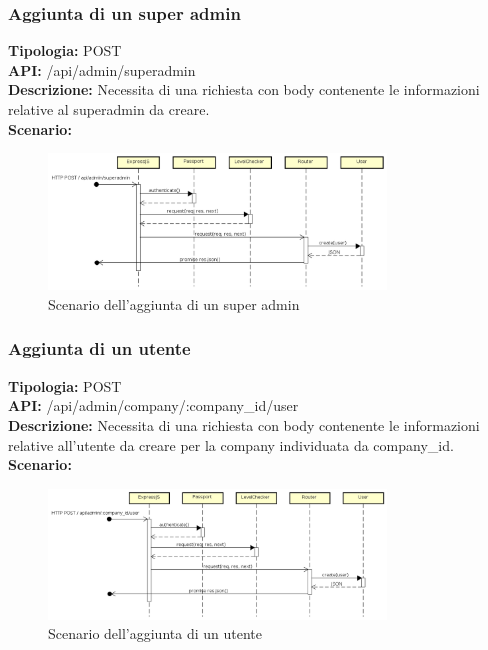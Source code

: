 \newpage
\subsubsection{Aggiunta di un super admin}
\textbf{Tipologia:} POST \\
\textbf{API:} /api/admin/superadmin \\
\textbf{Descrizione:} Necessita di una richiesta con body contenente le informazioni relative al superadmin da creare. \\
\textbf{Scenario:} 
\begin{figure}[h]
\centering
\includegraphics[width=0.8\textwidth]{res/sections/backend/(POST)superadmin.png}
\caption{Scenario dell'aggiunta di un super admin}
\end{figure}

\newpage
\subsubsection{Aggiunta di un utente}
\textbf{Tipologia:} POST \\
\textbf{API:} /api/admin/company/:company\_id/user \\
\textbf{Descrizione:} Necessita di una richiesta con body contenente le informazioni relative all'utente da creare per la company individuata da company\_id. \\
\textbf{Scenario:} 
\begin{figure}[h]
\centering
\includegraphics[width=0.8\textwidth]{res/sections/backend/(POST)userSA.png}
\caption{Scenario dell'aggiunta di un utente}
\end{figure}